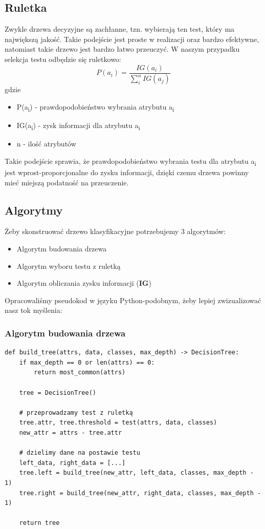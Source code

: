 \documentclass[11pt]{article}
\begin{document}
\pagebreak
\subsection{Ruletka}
\label{sec:org67ac858}
Zwykle drzewa decyzyjne są zachłanne, tzn. wybierają ten test, który ma największą jakość. Takie podejście jest proste w realizacji oraz bardzo efektywne, natomiast takie drzewo jest bardzo łatwo przeuczyć. W naszym przypadku selekcja testu odbędzie się ruletkowo:
\[
        P(a_i) = \frac{IG(a_i)}{\sum_i^n{IG(a_j)}}
\]
gdzie
\begin{itemize}
\item P(a\textsubscript{i}) - prawdopodobieństwo wybrania atrybutu a\textsubscript{i}
\item IG(a\textsubscript{i}) - zysk informacji dla atrybutu a\textsubscript{i}
\item n - ilość atrybutów
\end{itemize}
Takie podejście sprawia, że prawdopodobieństwo wybrania testu dla atrybutu a\textsubscript{i} jest wprost-proporcjonalne do zysku informacji, dzięki czemu drzewa powinny mieć miejszą podatność na przeuczenie.
\subsection{Algorytmy}
\label{sec:org4909e92}
Żeby skonstruować drzewo klasyfikacyjne potrzebujemy 3 algorytmów:
\begin{itemize}
\item Algorytm budowania drzewa
\item Algorytm wyboru testu z ruletką
\item Algorytm obliczania zysku informacji (\textbf{IG})
\end{itemize}
Opracowaliśmy pseudokod w języku Python-podobnym, żeby lepiej zwizualizować nasz tok myślenia:
\subsubsection{Algorytm budowania drzewa}
\label{sec:org8d16fe2}
\begin{verbatim}
def build_tree(attrs, data, classes, max_depth) -> DecisionTree:
    if max_depth == 0 or len(attrs) == 0:
        return most_common(attrs)

    tree = DecisionTree()

    # przeprowadzamy test z ruletką
    tree.attr, tree.threshold = test(attrs, data, classes)
    new_attr = attrs - tree.attr

    # dzielimy dane na postawie testu
    left_data, right_data = [...]
    tree.left = build_tree(new_attr, left_data, classes, max_depth - 1)
    tree.right = build_tree(new_attr, right_data, classes, max_depth - 1)

    return tree
\end{verbatim}
\end{document}
